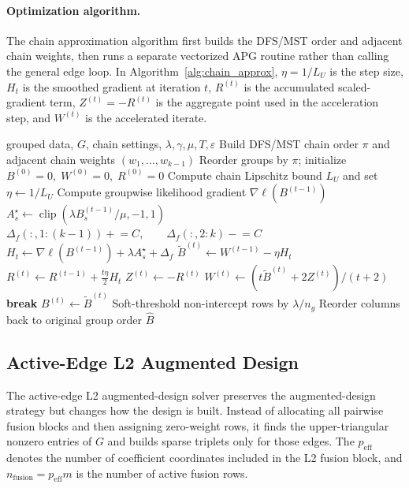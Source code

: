 \documentclass[twoside,11pt]{article}
\newcommand{\norm}[1]{\left\lVert #1 \right\rVert}
\DeclareMathOperator{\clip}{clip}
\begin{document}
\paragraph{Optimization algorithm.}
The chain approximation algorithm first builds the DFS/MST order and adjacent chain weights, then runs a separate vectorized APG routine rather than calling the general edge loop. 
In Algorithm~\ref{alg:chain_approx}, $\eta=1/L_U$ is the step size, $H_t$ is the smoothed gradient at iteration $t$, $R^{(t)}$ is the accumulated scaled-gradient term, $Z^{(t)}=-R^{(t)}$ is the aggregate point used in the acceleration step, and $W^{(t)}$ is the accelerated iterate.
\begin{algorithm}[H]
\caption{Chain Approximation APG}
\label{alg:chain_approx}
\begin{algorithmic}[1]
\Require grouped data, $G$, chain settings, $\lambda,\gamma,\mu,T,\varepsilon$
\State Build DFS/MST chain order $\pi$ and adjacent chain weights $(w_1,\dots,w_{k-1})$
\State Reorder groups by $\pi$; initialize $B^{(0)}=0,\;W^{(0)}=0,\;R^{(0)}=0$
\State Compute chain Lipschitz bound $L_U$ and set $\eta\gets 1/L_U$
  \State Compute groupwise likelihood gradient $\nabla \ell(B^{(t-1)})$
  \State $A_s^\star\gets\clip(\lambda B_s^{(t-1)}/\mu,-1,1)$
  \State $\Delta_f(:,1:(k-1)) \mathrel{+}= C,\qquad
  \Delta_f(:,2:k) \mathrel{-}= C$
  \State $H_t\gets \nabla \ell(B^{(t-1)})+\lambda A_s^\star+\Delta_f$
  \State $\tilde B^{(t)}\gets W^{(t-1)}-\eta H_t$
  \State $R^{(t)}\gets R^{(t-1)}+\frac{t\eta}{2}H_t$
  \State $Z^{(t)}\gets -R^{(t)}$
  \State $W^{(t)}\gets \left(t\tilde B^{(t)}+2Z^{(t)}\right)/(t+2)$
  \If{$\norm{\tilde B^{(t)}-B^{(t-1)}}_1<\varepsilon p$}
    \State \textbf{break}
  \EndIf
  \State $B^{(t)}\gets \tilde B^{(t)}$
\EndFor
\State Soft-threshold non-intercept rows by $\lambda/n_g$
\State Reorder columns back to original group order
\State \Return $\hat B$
\end{algorithmic}
\end{algorithm}



\subsection{Active-Edge L2 Augmented Design}

The active-edge L2 augmented-design solver preserves the augmented-design strategy but changes how the design is built.  
Instead of allocating all pairwise fusion blocks and then assigning zero-weight rows, it finds the upper-triangular nonzero entries of $G$ and builds sparse triplets only for those edges. 
The $p_{\mathrm{eff}}$ denotes the number of coefficient coordinates included in the L2 fusion block, and $n_{\mathrm{fusion}}=p_{\mathrm{eff}}m$ is the number of active fusion rows. 
\end{document}
